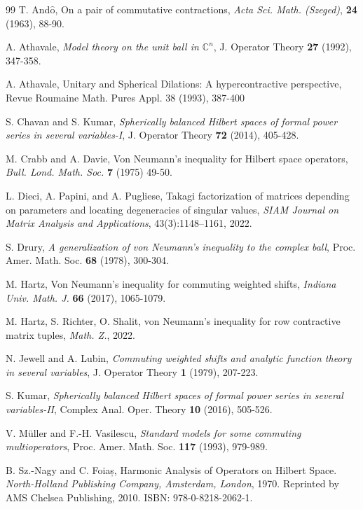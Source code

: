 \documentclass[12pt,reqno] {amsart}
\theoremstyle{remark}
\theoremstyle{definition}
\begin{document}
  

	\begin{thebibliography}{99}
T. And$\hat{\mbox{o}}$, On a pair of commutative contractions, {\it Acta Sci. Math. (Szeged)}, {\bf 24} (1963), 88-90.

 A. Athavale, {\it Model theory on the unit ball in
	$\mathbb C^n$}, J. Operator Theory  {\bf 27} (1992), 347-358.

 A. Athavale, Unitary and Spherical Dilations: A hypercontractive perspective, Revue Roumaine Math. Pures Appl. 38 (1993), 387-400
    
 S. Chavan and S. Kumar, {\it Spherically balanced Hilbert
	spaces of formal power series in several variables-I}, J. Operator Theory {\bf 72} (2014), 405-428.

M. Crabb and A. Davie, Von Neumann's inequality for Hilbert space operators, {\it Bull. Lond. Math. Soc.} {\bf 7} (1975) 49-50.


L. Dieci, A. Papini, and A. Pugliese,
Takagi factorization of matrices depending on parameters and locating degeneracies of singular values,
\textit{SIAM Journal on Matrix Analysis and Applications},
43(3):1148--1161, 2022.

 S. Drury, {\it A generalization of von Neumann's inequality to the complex
	ball}, Proc. Amer. Math. Soc. {\bf 68} (1978), 300-304.


 M. Hartz, Von Neumann's inequality for commuting weighted shifts, {\it Indiana Univ. Math. J.} {\textbf{66}} (2017), 1065-1079.

 M. Hartz, S. Richter, O. Shalit, von Neumann’s inequality for row contractive matrix tuples, {\it Math. Z.}, 2022.

 N. Jewell and A. Lubin, {\it Commuting weighted shifts
	and analytic function theory in several variables}, J. Operator Theory
{\bf 1} (1979), 207-223.	



 S. Kumar, {\it Spherically balanced Hilbert
	spaces of formal power series in several variables-II}, Complex Anal. Oper. Theory {\bf 10} (2016), 505-526.

 V. M\"{u}ller and F.-H. Vasilescu, \textit{Standard models for some commuting multioperators}, Proc. Amer. Math. Soc. {\bf 117} (1993), 979-989.	

    
 B. Sz.-Nagy and C. Foiaș,
Harmonic Analysis of Operators on Hilbert Space.
\textit{North-Holland Publishing Company, Amsterdam, London}, 1970.
Reprinted by AMS Chelsea Publishing, 2010.
ISBN: 978-0-8218-2062-1.




\end{thebibliography}
\end{document}
